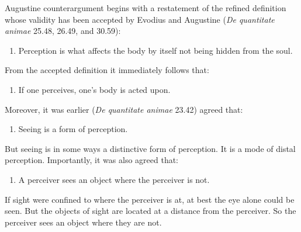 \documentclass[12pt]{article}
\begin{document}
Augustine counterargument begins with a restatement of the refined definition whose validity has been accepted by Evodius and Augustine (\emph{De quantitate animae} 25.48, 26.49, and 30.59):
\begin{enumerate}[1.]
	\item Perception is what affects the body by itself not being hidden from the soul.
\end{enumerate}
From the accepted definition it immediately follows that:
\begin{enumerate}[2.]
	\item If one perceives, one's body is acted upon.
\end{enumerate}
Moreover, it was earlier (\emph{De quantitate animae} 23.42) agreed that:
\begin{enumerate}[3.]
	\item Seeing is a form of perception.
\end{enumerate}
But seeing is in some ways a distinctive form of perception. It is a mode of distal perception. Importantly, it was also agreed that:
\begin{enumerate}[4.]
	\item A perceiver sees an object where the perceiver is not.
\end{enumerate}
If sight were confined to where the perceiver is at, at best the eye alone could be seen. But the objects of sight are located at a distance from the perceiver. So the perceiver sees an object where they are not. 
\end{document}
